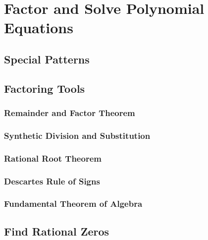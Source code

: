 \documentclass[]{book}
\begin{document}
\hypertarget{factor-and-solve-polynomial-equations}{%
\section{Factor and Solve Polynomial Equations}\label{factor-and-solve-polynomial-equations}}

\hypertarget{special-patterns}{%
\subsection{Special Patterns}\label{special-patterns}}

\hypertarget{factoring-tools}{%
\subsection{Factoring Tools}\label{factoring-tools}}

\hypertarget{remainder-and-factor-theorem}{%
\subsubsection{Remainder and Factor Theorem}\label{remainder-and-factor-theorem}}

\hypertarget{synthetic-division-and-substitution}{%
\subsubsection{Synthetic Division and Substitution}\label{synthetic-division-and-substitution}}

\hypertarget{rational-root-theorem}{%
\subsubsection{Rational Root Theorem}\label{rational-root-theorem}}

\hypertarget{descartes-rule-of-signs}{%
\subsubsection{Descartes Rule of Signs}\label{descartes-rule-of-signs}}

\hypertarget{fundamental-theorem-of-algebra}{%
\subsubsection{Fundamental Theorem of Algebra}\label{fundamental-theorem-of-algebra}}

\hypertarget{find-rational-zeros}{%
\subsection{Find Rational Zeros}\label{find-rational-zeros}}
\end{document}
